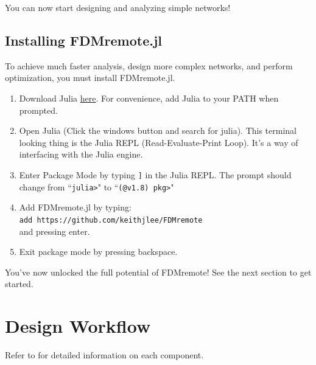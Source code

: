 \documentclass{ol-softwaremanual}
\begin{document}
You can now start designing and analyzing simple networks!

\subsection{Installing FDMremote.jl} \label{installjulia}
To achieve much faster analysis, design more complex networks, and perform optimization, you must install FDMremote.jl. 

\begin{enumerate}
    \item Download Julia \href{https://julialang.org/downloads/}{here}. For convenience, add Julia to your PATH when prompted.
    \item Open Julia (Click the windows button and search for julia). This terminal looking thing is the Julia REPL (Read-Evaluate-Print Loop). It's a way of interfacing with the Julia engine.
    \item Enter Package Mode by typing \texttt{]} in the Julia REPL. The prompt should change from ``\texttt{julia>}" to ``\texttt{(@v1.8) pkg>}"
    \item Add FDMremote.jl by typing:\\ \texttt{add https://github.com/keithjlee/FDMremote}\\ and pressing enter.
    \item Exit package mode by pressing backspace. 
\end{enumerate}

 You've now unlocked the full potential of FDMremote! See the next section to get started.

\newpage
\section{Design Workflow} \label{sec:workflow}
Refer to  for detailed information on each component. 



\newpage
\end{document}
